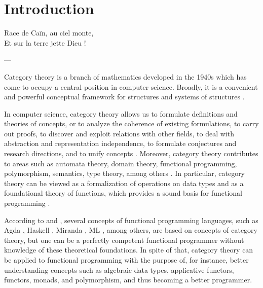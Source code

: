 \chapter{Introduction}
\label{chap:introduction}

\epigraph{
  Race de Caïn, au ciel monte,\\
  Et sur la terre jette Dieu !
}{---\textcite[16]{baudelaire-1857}}


Category theory is a branch of mathematics developed in the 1940s
which has come to occupy a central position in computer science.
Broadly, it is a convenient and powerful conceptual framework for
structures and systems of structures
\parencites[vii]{maclane-1998}[1]{marquis-2013}[1154]{wolfram-2002}.

In computer science, category theory allows us to formulate
definitions and theories of concepts, or to analyze the coherence of
existing formulations, to carry out proofs, to discover and exploit
relations with other fields, to deal with abstraction and
representation independence, to formulate conjectures and research
directions, and to unify concepts \parencites[49--50]{goguen-1991}.
Moreover, category theory contributes to areas such as automata
theory, domain theory, functional programming, polymorphism,
semantics, type theory, among others
\parencites[23]{marquis-2013}[xi]{pierce-1991}[415]{poigne-1992}. In
particular, category theory can be viewed as a formalization of
operations on data types and as a foundational theory of functions,
which provides a sound basis for functional programming
\parencites[414]{poigne-1992}[1154]{wolfram-2002}.

According to \textcite[73]{elkins-2009} and
\textcite[50--51]{yorgey-2009}, several concepts of functional
programming languages, such as Agda \parencites{norell-2007}{agda},
Haskell \parencite{peytonjones-2003}, Miranda \parencite{turner-1985},
ML \parencite{milner-1984}, among others, are based on concepts of
category theory, but one can be a perfectly competent functional
programmer without knowledge of these theoretical foundations. In
spite of that, category theory can be applied to functional
programming with the purpose of, for instance, better understanding
concepts such as algebraic data types, applicative functors, functors,
monads, and polymorphism, and thus becoming a better programmer.

